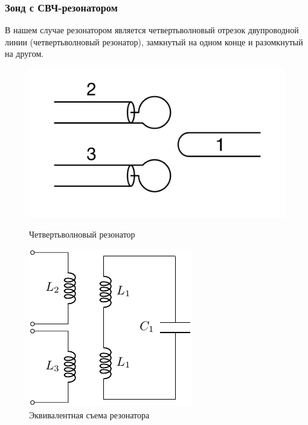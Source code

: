\documentclass[10pt,pdf,hyperref={unicode}, dvipsnames]{beamer}
\begin{document}
\begin{frame}
	\frametitle{Зонд с СВЧ-резонатором}
	В нашем случае резонатором является четвертьволновый отрезок двупроводной линии (четвертьволновый резонатор), замкнутый на одном конце и разомкнутый на другом. 
	\begin{figure}[H]
	\begin{minipage}{0.49\linewidth}
			\centering
			\includegraphics[width=\linewidth]{fig/resonator}
			\caption{Четвертьволновый резонатор}
			\label{fig:resonator}
	\end{minipage}
	\begin{minipage}{0.49\linewidth}		
			\centering
			\includegraphics[]{chem/chem1}
			\caption{Эквивалентная съема резонатора}
			\label{fig:chem1}
	\end{minipage}
	\end{figure}
\end{frame}

    
\end{document}
